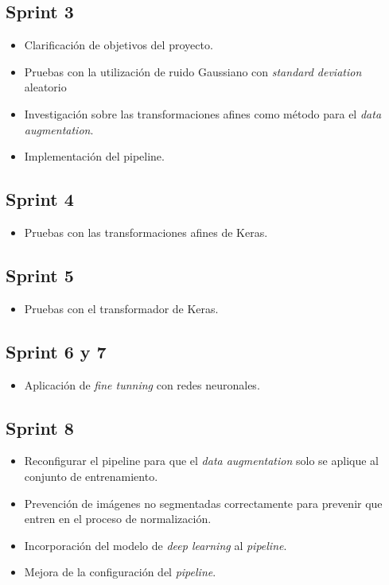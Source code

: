 \subsection{Sprint 3}

\begin{itemize}
\item Clarificación de objetivos del proyecto.
\item Pruebas con la utilización de ruido Gaussiano con \textit{standard deviation} aleatorio
\item Investigación sobre las transformaciones afines como método para el \textit{data augmentation}.
\item Implementación del pipeline.
\end{itemize}

\subsection{Sprint 4}

\begin{itemize}
\item Pruebas con las transformaciones afines de Keras.
\end{itemize}

\subsection{Sprint 5}

\begin{itemize}
\item Pruebas con el transformador de Keras.
\end{itemize}

\subsection{Sprint 6 y 7}

\begin{itemize}
\item Aplicación de \textit{fine tunning} con redes neuronales.
\end{itemize}

\subsection{Sprint 8}

\begin{itemize}
\item Reconfigurar el pipeline para que el \textit{data augmentation} solo se aplique al conjunto de entrenamiento.
\item Prevención de imágenes no segmentadas correctamente para prevenir que entren en el proceso de normalización.
\item Incorporación del modelo de \textit{deep learning} al \textit{pipeline}.
\item Mejora de la configuración del \textit{pipeline}.
\end{itemize}

